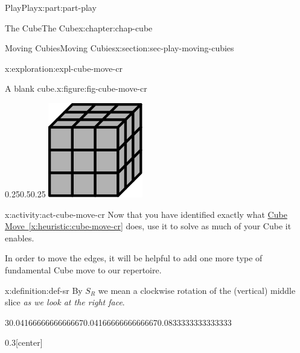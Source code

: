 \documentclass[oneside,10pt,]{book}
\newcommand{\xreffont}{\relax}
\numberwithin{equation}{section}
\begin{document}
\begin{partptx}{Play}{}{Play}{}{}{x:part:part-play}
\begin{chapterptx}{The Cube}{}{The Cube}{}{}{x:chapter:chap-cube}
\begin{sectionptx}{Moving Cubies}{}{Moving Cubies}{}{}{x:section:sec-play-moving-cubies}
\begin{exploration}{}{x:exploration:expl-cube-move-cr}
\begin{figureptx}{A blank cube.}{x:figure:fig-cube-move-cr}{}
\begin{image}{0.25}{0.5}{0.25}
\includegraphics[width=\linewidth]{./images/grey_cube.svg}
\end{image}%
\tcblower
\end{figureptx}%
\end{exploration}%
\begin{activity}{}{x:activity:act-cube-move-cr}%
Now that you have identified exactly what \hyperref[x:heuristic:cube-move-cr]{Cube Move~{\xreffont\ref{x:heuristic:cube-move-cr}}} does, use it to solve as much of your Cube it enables.%
\end{activity}%
In order to move the edges, it will be helpful to add one more type of fundamental Cube move to our repertoire.%
\begin{definition}{}{x:definition:def-sr}%
%
By \(S_R\) we mean a clockwise rotation of the (vertical) middle slice \emph{as we look at the right face}.%
\begin{sidebyside}{3}{0.0416666666666667}{0.0416666666666667}{0.0833333333333333}%
\begin{sbspanel}{0.3}[center]%

\end{sbspanel}
\end{sidebyside}
\end{definition}
\end{sectionptx}
\end{chapterptx}
\end{partptx}
\end{document}
